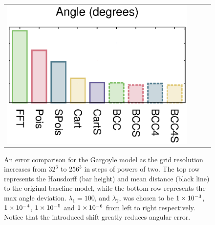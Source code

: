 \begin{figure}
\begin{tabular}{c c c c}
	\includegraphics[width=0.23\linewidth]{figures/angle256.eps} 
	\end{tabular}
	\caption{An error comparison for the Gargoyle model as the grid resolution increases from $32^3$ to $256^3$ in steps of powers of two. The top row represents the Hausdorff (bar height) and mean distance (black line) to the original baseline model, while the bottom row represents the max angle deviation. $\lambda_1 = 100$, and $\lambda_2$, was chosen to be $1\times 10^{-3}$, $1\times 10^{-4}$, $1\times 10^{-5}$ and $1\times 10^{-6}$ from left to right respectively. Notice that the introduced shift greatly reduces angular error.}
	\label{fig:t1}
\end{figure}

